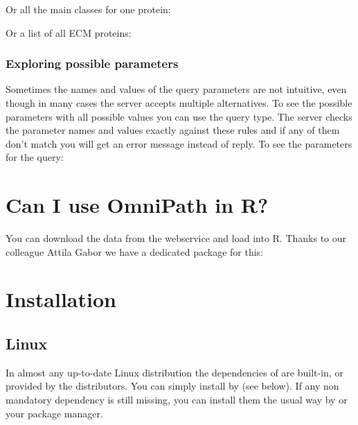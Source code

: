 \documentclass[letterpaper,10pt,english]{sphinxmanual}
\begin{document}
Or all the main classes for one protein:
\begin{quote}

\end{quote}

Or a list of all ECM proteins:
\begin{quote}

\end{quote}


\subsection{Exploring possible parameters}
\label{\detokenize{index:exploring-possible-parameters}}
Sometimes the names and values of the query parameters are not intuitive,
even though in many cases the server accepts multiple alternatives. To see
the possible parameters with all possible values you can use the 
query type. The server checks the parameter names and values exactly against
these rules and if any of them don’t match you will get an error message
instead of reply. To see the parameters for the  query:
\begin{quote}

\end{quote}


\chapter{Can I use OmniPath in R?}
\label{\detokenize{index:can-i-use-omnipath-in-r}}
You can download the data from the webservice and load into R. Thanks to
our colleague Attila Gabor we have a dedicated package for this:
\begin{quote}

\end{quote}


\chapter{Installation}
\label{\detokenize{index:installation}}

\section{Linux}
\label{\detokenize{index:linux}}
In almost any up-to-date Linux distribution the dependencies of  are
built-in, or provided by the distributors. You can simply install 
by  (see below).
If any non mandatory dependency is still missing, you can install them the
usual way by  or your package manager.
\end{document}
